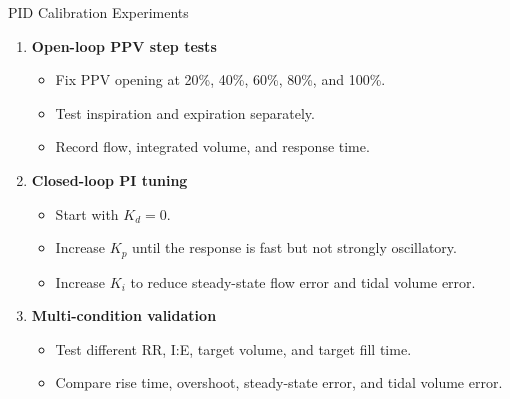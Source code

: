 \documentclass[aspectratio=169,10pt]{beamer}
\begin{document}
\begin{frame}[shrink=5]{PID Calibration Experiments}
  \begin{enumerate}
    \item \textbf{Open-loop PPV step tests}
      \begin{itemize}
        \item Fix PPV opening at 20\%, 40\%, 60\%, 80\%, and 100\%.
        \item Test inspiration and expiration separately.
        \item Record flow, integrated volume, and response time.
      \end{itemize}

    \item \textbf{Closed-loop PI tuning}
      \begin{itemize}
        \item Start with $K_d=0$.
        \item Increase $K_p$ until the response is fast but not strongly oscillatory.
        \item Increase $K_i$ to reduce steady-state flow error and tidal volume error.
      \end{itemize}

    \item \textbf{Multi-condition validation}
      \begin{itemize}
        \item Test different RR, I:E, target volume, and target fill time.
        \item Compare rise time, overshoot, steady-state error, and tidal volume error.
      \end{itemize}
  \end{enumerate}
\end{frame}
\end{document}
